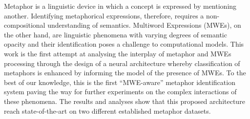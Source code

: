 Metaphor is a linguistic device in which a concept is expressed by mentioning another. Identifying metaphorical expressions, therefore, requires a non-compositional understanding of semantics. Multiword Expressions (MWEs), on the other hand, are linguistic phenomena with varying degrees of semantic opacity and their identification poses a challenge to computational models. This work is the first attempt at analysing the interplay of metaphor and MWEs processing through the design of a neural architecture whereby classification of metaphors is enhanced by informing the model of the presence of MWEs. To the best of our knowledge, this is the first ``MWE-aware'' metaphor identification system paving the way for further experiments on the complex interactions of these phenomena. The results and analyses show that this proposed architecture reach state-of-the-art on two different established metaphor datasets.
